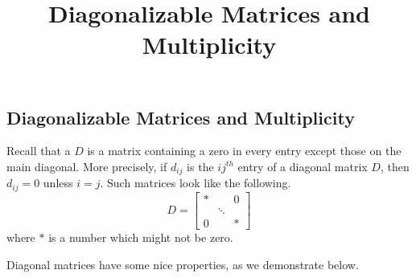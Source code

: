 \documentclass{ximera}
\title{Diagonalizable Matrices and Multiplicity} \license{CC BY-NC-SA 4.0}
\begin{document}
  
\begin{abstract}
\end{abstract}
\maketitle

\begin{onlineOnly}
\section*{Diagonalizable Matrices and Multiplicity}
\end{onlineOnly}

Recall that a  $D$ is a matrix containing a zero in every entry except those on the main diagonal.  More precisely, if $d_{ij}$ is the $ij^{th}$ entry of a diagonal matrix $D$, then
$d_{ij}=0$ unless $i=j$. Such
matrices look like the following.
\begin{equation*}
D = 
\begin{bmatrix}
* &  & 0 \\
& \ddots &  \\
0 &  & *
\end{bmatrix}
\end{equation*}
where $*$ is a number which might not be zero.


Diagonal matrices have some nice properties, as we demonstrate below.
\end{document}
